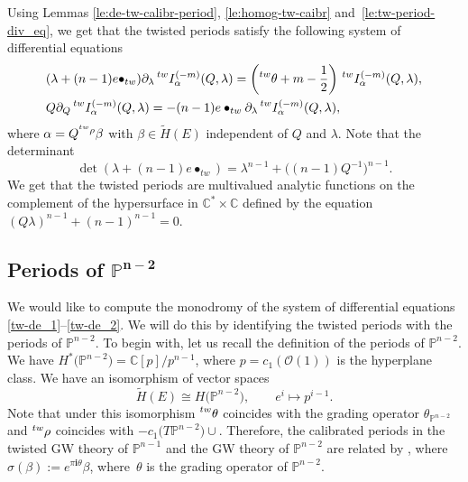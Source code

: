 \documentclass[pdftex]{sigma}
\numberwithin{equation}{section}
\newcommand{\leftexp}[2]{{\vphantom{#2}}^{#1}{#2}}
\newcommand{\CC}{\mathbb{C}}
\newcommand{\PP}{\mathbb{P}}
\newcommand{\ii}{\mathbf{i}}
\renewcommand{\O}{\mathcal{O}}
\begin{document}
Using Lemmas \ref{le:de-tw-calibr-period}, \ref{le:homog-tw-caibr} and~\ref{le:tw-period-div_eq}, we get that the twisted periods satisfy
the following system of differential equations
\begin{align}
\label{tw-de_1}
&(\lambda+(n-1) e\bullet_{tw}) \partial_\lambda \,
\leftexp{tw}{I}^{(-m)}_\alpha(Q,\lambda) =
\left(
\leftexp{tw}{\theta}+m-\frac{1}{2}\right)\,
\leftexp{tw}{I}^{(-m)}_\alpha(Q,\lambda), \\
\label{tw-de_2}
&Q\partial_Q \,
\leftexp{tw}{I}^{(-m)}_\alpha(Q,\lambda) =
-(n-1)e\bullet_{tw}\partial_\lambda\,
\leftexp{tw}{I}^{(-m)}_\alpha(Q,\lambda),
\end{align}
where $\alpha= Q^{\leftexp{tw}{\rho}} \beta$ with $\beta\in
\widetilde{H}(E)$ independent of $Q$ and $\lambda$. Note that the
determinant
\[
\operatorname{det}(\lambda+(n-1) e\bullet_{tw}) =
\lambda^{n-1} + \big( (n-1)Q^{-1}\big) ^{n-1}.
\]
We get that the twisted periods are multivalued analytic functions on
the complement of the hypersurface in $\CC^*\times\CC$ defined by the
equation $(Q\lambda)^{n-1}+(n-1)^{n-1}=0$.

\subsection[Periods of P\^\{n-2\}]{Periods of $\boldsymbol{\PP^{n-2}}$}
\label{sec:proj_periods}

We would like to compute the monodromy of the system of differential
equations \eqref{tw-de_1}--\eqref{tw-de_2}. We will do this by
identifying the twisted periods with the periods of $\PP^{n-2}$. To
begin with, let us recall the definition of the periods of
$\PP^{n-2}$. We have $H^*\big(\PP^{n-2}\big) = \CC[p]/p^{n-1}$, where
$p=c_1(\O(1))$ is the hyperplane class. We have an isomorphism of
vector spaces
\[
\widetilde{H}(E)\cong H\big(\PP^{n-2}\big),\qquad e^i \mapsto p^{i-1}.
\]
Note that under this isomorphism $\leftexp{tw}{\theta}$ coincides with
the grading operator $\theta_{\PP^{n-2}}$ and $\leftexp{tw}{\rho}$
coincides with $-c_1\big(T\PP^{n-2}\big)\cup$. Therefore, the calibrated
periods in the twisted GW theory of $\PP^{n-1}$ and the GW theory of
$\PP^{n-2}$ are related by \smash{$e^{\leftexp{tw}{\theta} \pi\ii }
\leftexp{tw}{ \widetilde{I}_\beta^{(-m)} } (\lambda) =
\widetilde{I}^{(-m)}_{\sigma(\beta)}(\lambda)$},
where $\sigma(\beta) := e^{\pi\ii \theta } \beta$, where~$\theta$ is
the grading operator of $\PP^{n-2}$.
\end{document}
